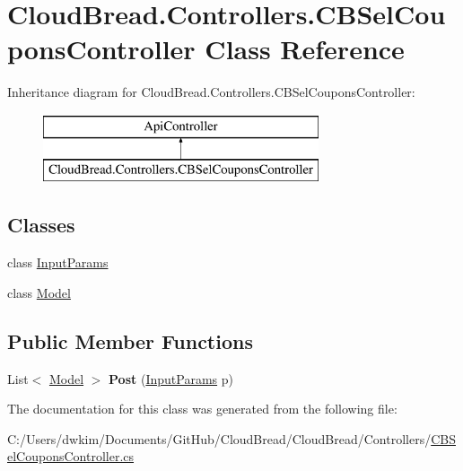 \hypertarget{class_cloud_bread_1_1_controllers_1_1_c_b_sel_coupons_controller}{}\section{Cloud\+Bread.\+Controllers.\+C\+B\+Sel\+Coupons\+Controller Class Reference}
\label{class_cloud_bread_1_1_controllers_1_1_c_b_sel_coupons_controller}
Inheritance diagram for Cloud\+Bread.\+Controllers.\+C\+B\+Sel\+Coupons\+Controller\+:\begin{figure}[H]
\begin{center}
\leavevmode
\includegraphics[height=2.000000cm]{class_cloud_bread_1_1_controllers_1_1_c_b_sel_coupons_controller}
\end{center}
\end{figure}
\subsection*{Classes}
\begin{DoxyCompactItemize}
\item 
class \hyperlink{class_cloud_bread_1_1_controllers_1_1_c_b_sel_coupons_controller_1_1_input_params}{Input\+Params}
\item 
class \hyperlink{class_cloud_bread_1_1_controllers_1_1_c_b_sel_coupons_controller_1_1_model}{Model}
\end{DoxyCompactItemize}
\subsection*{Public Member Functions}
\begin{DoxyCompactItemize}
\item 
List$<$ \hyperlink{class_cloud_bread_1_1_controllers_1_1_c_b_sel_coupons_controller_1_1_model}{Model} $>$ {\bfseries Post} (\hyperlink{class_cloud_bread_1_1_controllers_1_1_c_b_sel_coupons_controller_1_1_input_params}{Input\+Params} p)\hypertarget{class_cloud_bread_1_1_controllers_1_1_c_b_sel_coupons_controller_a3de4395ed278d0b0de328f87d4641297}{}\label{class_cloud_bread_1_1_controllers_1_1_c_b_sel_coupons_controller_a3de4395ed278d0b0de328f87d4641297}

\end{DoxyCompactItemize}


The documentation for this class was generated from the following file\+:\begin{DoxyCompactItemize}
\item 
C\+:/\+Users/dwkim/\+Documents/\+Git\+Hub/\+Cloud\+Bread/\+Cloud\+Bread/\+Controllers/\hyperlink{_c_b_sel_coupons_controller_8cs}{C\+B\+Sel\+Coupons\+Controller.\+cs}\end{DoxyCompactItemize}

